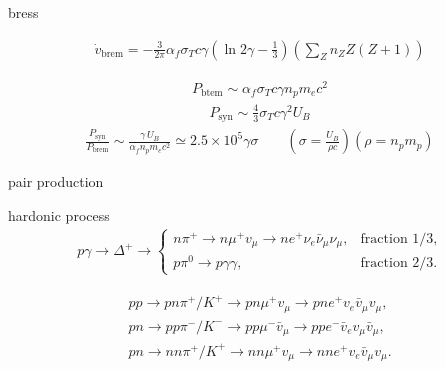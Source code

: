 \documentclass{article}
\begin{document}
bress

\begin{align*}
    \dot{v}_{\text{brem}} = -\frac{3}{2\pi} \alpha_f \sigma_T c \gamma \left( \ln 2\gamma - \frac{1}{3} \right) \left( \sum_Z n_Z Z(Z + 1) \right)
\end{align*}

\begin{align*}
    P_{\text{btem}} \sim \alpha_f \sigma_T c \gamma n_p m_e c^2
\end{align*}
\begin{align*}
    P_{\text{syn}} \sim \frac{4}{3} \sigma_T c \gamma^2 U_B
\end{align*}
\begin{align*}
    \frac{P_{\text{syn}}}{P_{\text{brem}}} \sim \frac{\gamma \, U_B}{\alpha_f n_p m_e c^2} \simeq 2.5 \times 10^5 \gamma \sigma \qquad (\sigma=\frac{U_B}{\rho c}) (\rho = n_p m_p)
\end{align*}

pair production



hardonic process
\begin{align*}
    p \gamma \to \Delta^+ \to \begin{cases}
                                  n \pi^{+} \to n \mu^{+} v_\mu \to n e^{+} \nu_e \bar{\nu}_\mu \nu_\mu, & \text{fraction 1/3}, \\
                                  p \pi^0 \to p \gamma \gamma,                                           & \text{fraction 2/3}.
                              \end{cases}
\end{align*}

\begin{align*}
    pp \to pn\pi^+/K^+ \to pn\mu^+ v_\mu \to pne^+ v_e \bar{v}_\mu v_\mu,             \\
    pn \to pp\pi^-/K^- \to pp\mu^- \bar{v}_\mu \to ppe^- \bar{v}_e v_\mu \bar{v}_\mu, \\
    pn \to nn\pi^+/K^+ \to nn\mu^+ v_\mu \to nne^+ v_e \bar{v}_\mu v_\mu.
\end{align*}
\end{document}

